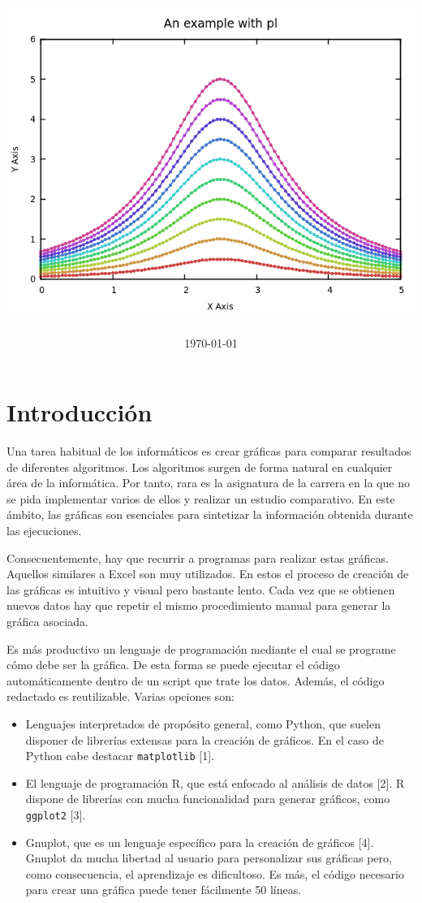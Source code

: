 \documentclass{article}
\title{                                             %
    \textmd{\textbf{\titulo}} \\         %
    \asignatura \\ 
    \vspace{0.5in}
    \includegraphics[width=\textwidth]{../../images/example.png}
    \vspace{0.3cm}
}
\author{\textbf{\autor}}                            %
\date{\today}                                             %
\begin{document}
\maketitle



\newpage
\tableofcontents
\listoflistings      %
\newpage


\section{Introducción}

	Una tarea habitual de los informáticos es crear gráficas para comparar resultados de diferentes algoritmos. Los algoritmos surgen de forma natural en cualquier área de la informática. Por tanto, rara es la asignatura de la carrera en la que no se pida implementar varios de ellos y realizar un estudio comparativo. En este ámbito, las gráficas son esenciales para sintetizar la información obtenida durante las ejecuciones.

	Consecuentemente, hay que recurrir a programas para realizar estas gráficas. Aquellos similares a Excel son muy utilizados. En estos el proceso de creación de las gráficas es intuitivo y visual pero bastante lento. Cada vez que se obtienen nuevos datos hay que repetir el mismo procedimiento manual para generar la gráfica asociada. 
	
	Es más productivo un lenguaje de programación mediante el cual se programe cómo debe ser la gráfica. De esta forma se puede ejecutar el código automáticamente dentro de un script que trate los datos. Además, el código redactado es reutilizable. Varias opciones son:
	
	\begin{itemize}
		\item Lenguajes interpretados de propósito general, como Python, que suelen disponer de librerías extensas para la creación de gráficos. En el caso de Python cabe destacar \texttt{matplotlib} [1].
		\item El lenguaje de programación R, que está enfocado al análisis de datos [2]. R dispone de librerías con mucha funcionalidad para generar gráficos, como \texttt{ggplot2} [3].
		\item Gnuplot, que es un lenguaje específico para la creación de gráficos [4]. Gnuplot da mucha libertad al usuario para personalizar sus gráficas pero, como consecuencia, el aprendizaje es dificultoso. Es más, el código necesario para crear una gráfica puede tener fácilmente 50 líneas.
	\end{itemize} 
	
\end{document}
